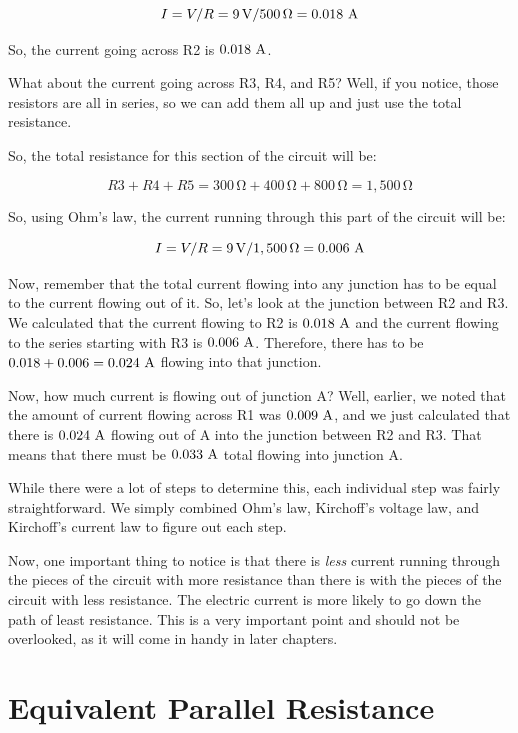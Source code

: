 $$I = V / R = 9\,\si{\volt} / 500\,\si{\ohm} = 0.018\,\,\si{\ampere}$$

So, the current going across R2 is $0.018\,\,\si{\ampere}$.

What about the current going across R3, R4, and R5?
Well, if you notice, those resistors are all in series, so we can add them all up and just use the total resistance.

So, the total resistance for this section of the circuit will be:

$$R3 + R4 + R5 = 300\,\si{\ohm} + 400\,\si{\ohm} + 800\,\si{\ohm} = 1,500\,\si{\ohm}$$

So, using Ohm's law, the current running through this part of the circuit will be:

$$I = V / R = 9\,\si{\volt} / 1,500\,\si{\ohm} = 0.006\,\,\si{\ampere}$$

Now, remember that the total current flowing into any junction has to be equal to the current flowing out of it.
So, let's look at the junction between R2 and R3.  
We calculated that the current flowing to R2 is $0.018\,\,\si{\ampere}$ and the current flowing to the series starting with R3 is $0.006\,\,\si{\ampere}$.
Therefore, there has to be $0.018 + 0.006 = 0.024\,\,\si{\ampere}$ flowing into that junction.

Now, how much current is flowing out of junction A?
Well, earlier, we noted that the amount of current flowing across R1 was $0.009\,\,\si{\ampere}$, and we just calculated that there is $0.024\,\,\si{\ampere}$ flowing out of A into the junction between R2 and R3. 
That means that there must be $0.033\,\,\si{\ampere}$ total flowing into junction A.

While there were a lot of steps to determine this, each individual step was fairly straightforward.
We simply combined Ohm's law, Kirchoff's voltage law, and Kirchoff's current law to figure out each step.

Now, one important thing to notice is that there is \emph{less} current running through the pieces of the circuit with more resistance than there is with the pieces of the circuit with less resistance.
The electric current is more likely to go down the path of least resistance.
This is a very important point and should not be overlooked, as it will come in handy in later chapters.

\section{Equivalent Parallel Resistance}

